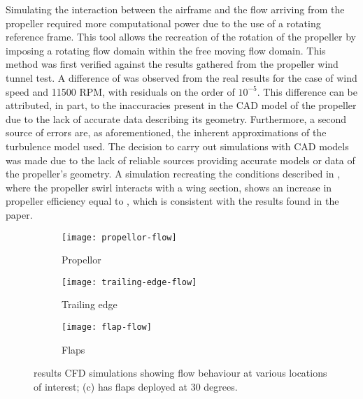 \documentclass[../../main.tex]{subfiles}
\begin{document}
Simulating the interaction between the airframe and the flow arriving from the propeller required more computational power due to the use of a rotating reference frame.
This tool allows the recreation of the rotation of the propeller by imposing a rotating flow domain within the free moving flow domain.
This method was first verified against the results gathered from the propeller wind tunnel test.
A difference of  was observed from the real results for the case of  wind speed and 11500 RPM, with residuals on the order of $10^{-5}$.
This difference can be attributed, in part, to the inaccuracies present in the CAD model of the propeller due to the lack of accurate data describing its geometry.
Furthermore, a second source of errors are, as aforementioned, the inherent approximations of the turbulence model used.
The decision to carry out simulations with CAD models was made due to the lack of reliable sources providing accurate models or data of the propeller's geometry.
A simulation recreating the conditions described in \cite{kroo-86}, where the propeller swirl interacts with a wing section, shows an increase in propeller efficiency equal to , which is consistent with the results found in the paper.


\begin{figure}[H]

    \centering
    \begin{subfigure}[b]{0.49\columnwidth}
        \centering
        \texttt{[image: propellor-flow]}
        \caption{Propellor}
        \label{fig:flow-behaviour:propellor}
    \end{subfigure}
    \hfill
    \begin{subfigure}[b]{0.49\columnwidth}
        \centering
        \texttt{[image: trailing-edge-flow]}
        \caption{Trailing edge}
        \label{fig:flow-behaviour:trailing-edge}
    \end{subfigure}

    \begin{subfigure}[b]{0.49\columnwidth}
        \centering
        \texttt{[image: flap-flow]}
        \caption{Flaps}
        \label{fig:flow-behaviour:flaps}
    \end{subfigure}
    
    \caption{results CFD simulations showing flow behaviour at various locations of interest; (c) has flaps deployed at 30 degrees.}
    \label{fig:flow-behaviour}
\end{figure} 
\end{document}
